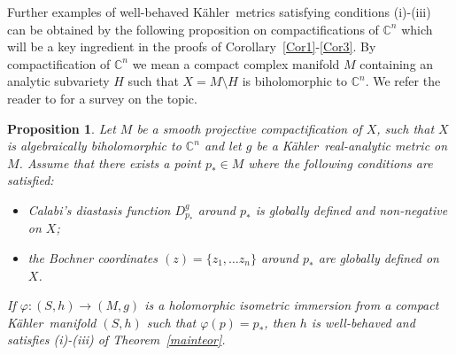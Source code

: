 \documentclass[12pt]{amsart}
\newcommand{\C}{\mathbb{C}}
\newcommand{\K}{K\"{a}hler}
\newtheorem{prop}{Proposition}
\begin{document}
Further examples of well-behaved \K\ metrics 
satisfying conditions (i)-(iii) can be obtained by the following proposition on compactifications of $\C^n$ which will be a key ingredient in the proofs of Corollary~\ref{Cor1}-\ref{Cor3}.
By compactification of $\C^n$ we mean a compact complex manifold $M$ containing an analytic subvariety $H$ such that $X = M\setminus H$ is biholomorphic to $\C^n$.
We refer the reader to  \cite{PeternellSchneider91Compactification} for a survey on the topic.
\begin{prop}\label{proptoric}
	Let $M$ be a smooth projective compactification of $X$, such that $X$ is algebraically biholomorphic to $\C^n$ and let 
	$g$ be a \K\ real-analytic metric on $M$. Assume that there exists a point $p_*\in M$ where  the following conditions are satisfied:
	\begin{itemize}
		\item [$(A')$]
		Calabi's diastasis function $D^g_{p_*}$ around $p_*$ is globally defined and non-negative on $X$;
		\item [$(B')$]
		the Bochner coordinates  $(z)=\{z_1, \dots z_n\}$ around $p_*$ are globally defined on $X$.
	\end{itemize}
If  $\varphi: (S, h)\rightarrow (M, g)$ is a holomorphic isometric immersion from a compact \K\ manifold $(S, h)$ such that $\varphi (p)=p_*$, then $h$ is well-behaved and 
	satisfies (i)-(iii) of Theorem~\ref{mainteor}.
\end{prop}
\end{document}
